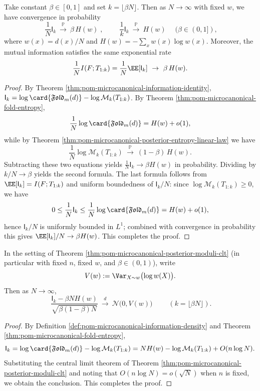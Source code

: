 \begin{theorem}\label{thm:pom-microcanonical-information-linear-law}
Take constant \(\beta\in[0,1]\) and set \(k=\lfloor\beta N\rfloor\).
Then as \(N\to\infty\) with fixed \(w\), we have convergence in probability
\[
\boxed{\;
\frac{1}{N}\mathsf{I}_k\ \xrightarrow{\ \mathbb{P}\ }\ \beta\,H(w)\;},
\qquad
\boxed{\;
\frac{1}{k}\mathsf{I}_k\ \xrightarrow{\ \mathbb{P}\ }\ H(w)\;}
\quad(\beta\in(0,1]),
\]
where \(w(x)=d(x)/N\) and \(H(w)=-\sum_x w(x)\log w(x)\).
Moreover, the mutual information satisfies the same exponential rate
\[
\frac{1}{N}I(F;T_{1:k})=\frac{1}{N}\EE[\mathsf{I}_k]\ \to\ \beta\,H(w).
\]
\end{theorem}
\begin{proof}
By Theorem \ref{thm:pom-microcanonical-information-identity},
\(
\mathsf{I}_k=\log\card{\mathfrak{Fold}_m(d)}-\log\mathcal{M}_k(T_{1:k})
\).
By Theorem \ref{thm:pom-microcanonical-fold-entropy},
\[
\frac{1}{N}\log\card{\mathfrak{Fold}_m(d)}=H(w)+o(1),
\]
while by Theorem \ref{thm:pom-microcanonical-posterior-entropy-linear-law} we have
\[
\frac{1}{N}\log\mathcal{M}_k(T_{1:k})\ \xrightarrow{\ \mathbb{P}\ }\ (1-\beta)\,H(w).
\]
Subtracting these two equations yields \(\frac{1}{N}\mathsf{I}_k\to \beta H(w)\) in probability.
Dividing by \(k/N\to\beta\) yields the second formula.
The last formula follows from \(\EE[\mathsf{I}_k]=I(F;T_{1:k})\) and uniform boundedness of \(\mathsf{I}_k/N\): since \(\log\mathcal{M}_k(T_{1:k})\ge 0\), we have
\[
0\le \frac{1}{N}\mathsf{I}_k\le \frac{1}{N}\log\card{\mathfrak{Fold}_m(d)}=H(w)+o(1),
\]
hence \(\mathsf{I}_k/N\) is uniformly bounded in \(L^1\); combined with convergence in probability this gives
\(
\EE[\mathsf{I}_k]/N\to \beta H(w)
\).
This completes the proof.
\end{proof}

\begin{corollary}\label{cor:pom-microcanonical-information-clt}
In the setting of Theorem \ref{thm:pom-microcanonical-posterior-moduli-clt} (in particular with fixed \(n\), fixed \(w\), and \(\beta\in(0,1)\)),
write
\[
V(w):=\Var_{X\sim w}\bigl(\log w(X)\bigr).
\]
Then as \(N\to\infty\),
\[
\boxed{\;
\frac{\mathsf{I}_k-\beta N H(w)}{\sqrt{\beta(1-\beta)N}}
\ \xrightarrow{d}\ \mathcal N\bigl(0,V(w)\bigr)\;}
\qquad\left(k=\lfloor\beta N\rfloor\right).
\]
\end{corollary}
\begin{proof}
By Definition \ref{def:pom-microcanonical-information-density} and Theorem \ref{thm:pom-microcanonical-fold-entropy},
\[
\mathsf{I}_k
=\log\card{\mathfrak{Fold}_m(d)}-\log\mathcal{M}_k(T_{1:k})
=NH(w)-\log\mathcal{M}_k(T_{1:k})+O(n\log N).
\]
Substituting the central limit theorem of Theorem \ref{thm:pom-microcanonical-posterior-moduli-clt} and noting that \(O(n\log N)=o(\sqrt N)\) when \(n\) is fixed, we obtain the conclusion. This completes the proof.
\end{proof}

